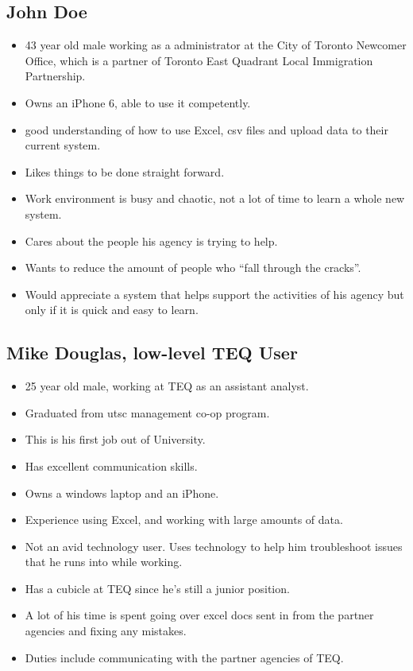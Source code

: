 \documentclass[12pt]{article}
\begin{document}
\subsection{John Doe}
\begin{itemize}%
\item 43 year old male working as a administrator at the City of Toronto Newcomer Office, which is a partner of Toronto East Quadrant Local Immigration Partnership.
\item Owns an iPhone 6, able to use it competently.
\item good understanding of how to use Excel, csv files and upload data to their current system.
\item Likes things to be done straight forward.
\item Work environment is busy and chaotic, not a lot of time to learn a whole new system.
\item Cares about the people his agency is trying to help.
\item Wants to reduce the amount of people who “fall through the cracks”.
\item Would appreciate a system that helps support the activities of his agency but only if it is quick and easy to learn.

 \end{itemize}

\subsection{Mike Douglas, low-level TEQ User}
\begin{itemize}%
\item 25 year old male, working at TEQ as an assistant analyst.
\item Graduated from utsc management co-op program.
\item This is his first job out of University.
\item Has excellent communication skills.
\item Owns a windows laptop and an iPhone.
\item Experience using Excel, and working with large amounts of data.
\item Not an avid technology user. Uses technology to help him troubleshoot issues that he runs into while working.
\item Has a cubicle at TEQ since he’s still a junior position.
\item A lot of his time is spent going over excel docs sent in from the partner agencies and fixing any mistakes.
\item Duties include communicating with the partner agencies of TEQ.

 \end{itemize}
 
\end{document}

